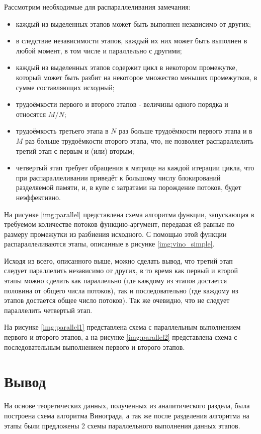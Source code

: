 Рассмотрим необходимые для распараллеливания замечания:
\begin{itemize}
	\item каждый из выделенных этапов может быть выполнен независимо от других;
	\item в следствие независимости этапов, каждый их них может быть выполнен в любой момент, в том числе и параллельно с другими;
	\item каждый из выделенных этапов содержит цикл в некотором промежутке, который может быть разбит на некоторое множество меньших промежутков, в сумме составляющих исходный;
	\item трудоёмкости первого и второго этапов - величины одного порядка и относятся $M / N$;
	\item трудоёмкость третьего этапа в $N$ раз больше трудоёмкости первого этапа и в $M$ раз больше трудоёмкости второго этапа, что, не позволяет распараллелить третий этап с первым и (или) вторым;
	\item четвертый этап требует обращения к матрице на каждой итерации цикла, что при распараллеливании приведёт к большому числу блокирований разделяемой памяти, и, в купе с затратами на порождение потоков, будет неэффективно.
\end{itemize}
\clearpage

На рисунке \ref{img:parallel} представлена схема алгоритма функции, запускающая в требуемом количестве потоков функцию-аргумент, передавая ей равные по размеру промежутки из разбиения исходного. С помощью этой функции распараллеливаются этапы, описанные в рисунке \ref{img:vino_simple}.


Исходя из всего, описанного выше, можно сделать вывод, что третий этап следует параллелить независимо от других, в то время как первый и второй этапы можно сделать как параллельно (где каждому из этапов достается половина от общего числа потоков), так и последовательно (где каждому из этапов достается общее число потоков). Так же очевидно, что не следует параллелить четвертый этап.

На рисунке \ref{img:parallel1} представлена схема с параллельным выполнением первого и второго этапов, а на рисунке \ref{img:parallel2} представлена схема с последовательным выполнением первого и второго этапов.



\section*{Вывод}

На основе теоретических данных, полученных из аналитического раздела, была построена схема алгоритма Винограда, а так же после разделения алгоритма на этапы были предложены 2 схемы параллельного выполнения данных этапов.